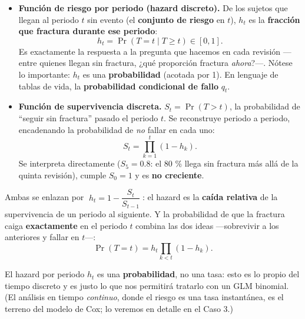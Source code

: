\documentclass[
  letterpaper,
  DIV=11,
  numbers=noendperiod]{scrartcl}
\begin{document}
\begin{itemize}
\item
  \textbf{Función de riesgo por periodo (hazard discreto).} De los
  sujetos que llegan al periodo \(t\) sin evento (el \textbf{conjunto de
  riesgo} en \(t\)), \(h_t\) es la \textbf{fracción que fractura durante
  ese periodo}: \[
  h_t=\Pr(T=t\mid T\ge t)\in[0,1].
  \] Es exactamente la respuesta a la pregunta que hacemos en cada
  revisión ---entre quienes llegan sin fractura, ¿qué proporción
  fractura \emph{ahora}?---. Nótese lo importante: \(h_t\) es una
  \textbf{probabilidad} (acotada por 1). En lenguaje de tablas de vida,
  la \textbf{probabilidad condicional de fallo} \(q_t\).
\item
  \textbf{Función de supervivencia discreta.} \(S_t=\Pr(T>t)\), la
  probabilidad de ``seguir sin fractura'' pasado el periodo \(t\). Se
  reconstruye periodo a periodo, encadenando la probabilidad de
  \emph{no} fallar en cada uno: \[
  S_t=\prod_{k=1}^{t}(1-h_k).
  \] Se interpreta directamente (\(S_5=0.8\): el 80 \% llega sin
  fractura más allá de la quinta revisión), cumple \(S_0=1\) y es
  \textbf{no creciente}.
\end{itemize}

Ambas se enlazan por \(\;h_t=1-\dfrac{S_t}{S_{t-1}}\;\): el hazard es la
\textbf{caída relativa} de la supervivencia de un periodo al siguiente.
Y la probabilidad de que la fractura caiga \textbf{exactamente} en el
periodo \(t\) combina las dos ideas ---sobrevivir a los anteriores y
fallar en \(t\)---: \[
\Pr(T=t)=h_t\prod_{k<t}(1-h_k).
\]

\begin{tcolorbox}[enhanced jigsaw, coltitle=black, rightrule=.15mm, arc=.35mm, leftrule=.75mm, colback=white, colbacktitle=quarto-callout-note-color!10!white, left=2mm, breakable, toptitle=1mm, toprule=.15mm, bottomtitle=1mm, titlerule=0mm, title=\textcolor{quarto-callout-note-color}{\faInfo}\hspace{0.5em}{Un apunte}, bottomrule=.15mm, opacityback=0, opacitybacktitle=0.6, colframe=quarto-callout-note-color-frame]

El hazard por periodo \(h_t\) es una \textbf{probabilidad}, no una tasa:
esto es lo propio del tiempo discreto y es justo lo que nos permitirá
tratarlo con un GLM binomial. (El análisis en tiempo \emph{continuo},
donde el riesgo es una tasa instantánea, es el terreno del modelo de
Cox; lo veremos en detalle en el Caso 3.)

\end{tcolorbox}
\end{document}

